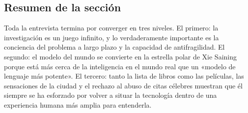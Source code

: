 \subsection{Resumen de la sección}

Toda la entrevista termina por converger en tres niveles. El primero: la investigación es un juego infinito, y lo verdaderamente importante es la conciencia del problema a largo plazo y la capacidad de antifragilidad. El segundo: el modelo del mundo se convierte en la estrella polar de Xie Saining porque está más cerca de la inteligencia en el mundo real que un «modelo de lenguaje más potente». El tercero: tanto la lista de libros como las películas, las sensaciones de la ciudad y el rechazo al abuso de citas célebres muestran que él siempre se ha esforzado por volver a situar la tecnología dentro de una experiencia humana más amplia para entenderla.

